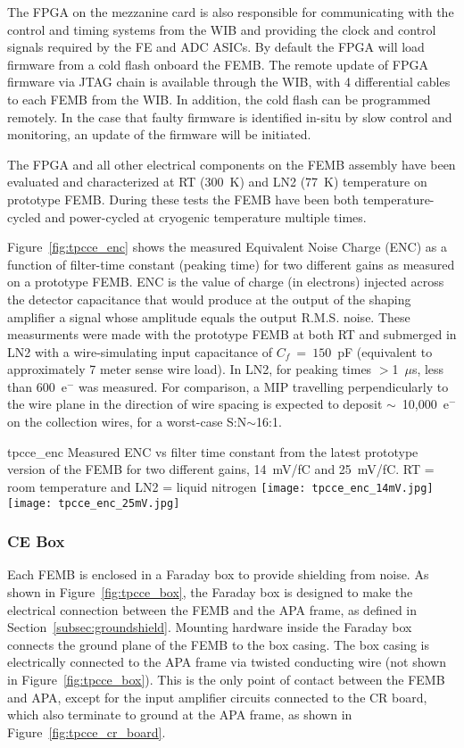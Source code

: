 The FPGA on the mezzanine card is also responsible for communicating with the
control and timing systems from the WIB and providing the clock and control signals required by the FE and ADC ASICs. 
By default the FPGA will load firmware from a cold flash onboard the FEMB. The remote update of 
FPGA firmware via JTAG chain is available through the WIB, with 4 differential cables to each FEMB 
from the WIB. In addition, the cold flash can be programmed remotely. In the case that faulty firmware 
is identified in-situ by slow control and monitoring, an update of the firmware will be initiated.

The FPGA and all other electrical components on the FEMB
assembly have been evaluated and characterized at RT (300~K) and LN2 (77~K) temperature on 
prototype FEMB. During these tests the FEMB have been both temperature-cycled and power-cycled at
cryogenic temperature multiple times.

Figure~\ref{fig:tpcce_enc} shows the measured Equivalent Noise Charge (ENC) as a function of 
filter-time constant (peaking time) for two different gains as measured on a prototype FEMB. ENC is the value of charge 
(in electrons) injected across the detector capacitance that would produce at the output of the 
shaping amplifier a signal whose amplitude equals the output R.M.S. noise. These measurments
were made with the prototype FEMB at both RT and submerged in LN2 with a wire-simulating input capacitance of $C_f~=~150$~pF
(equivalent to approximately 7 meter sense wire load).
In LN2, for peaking times $>$1~$\mu$s, less than 600~e$^{-}$ was measured. For comparison,
a MIP travelling perpendicularly to the wire plane in the direction of wire spacing is
expected to deposit $\sim$~10,000~e$^{-}$ on the collection wires, for a worst-case
S:N$\sim$16:1.

\begin{cdrfigure}{tpcce_enc}{
Measured ENC vs filter time constant from the latest prototype version of the FEMB
for two different gains, 14~mV/fC and 25~mV/fC. RT = room temperature and 
LN2 = liquid nitrogen}
\texttt{[image: tpcce\_enc\_14mV.jpg]}
\texttt{[image: tpcce\_enc\_25mV.jpg]}
\end{cdrfigure}

\subsubsection{CE Box}

Each FEMB is enclosed in a Faraday box to provide shielding from noise. 
As shown in Figure~\ref{fig:tpcce_box}, the Faraday box is designed to make the electrical connection 
between the FEMB and the APA frame, as defined in Section~\ref{subsec:groundshield}. Mounting 
hardware inside the Faraday box connects the ground plane of the FEMB to the box casing. The
box casing is electrically connected to the APA frame via twisted conducting wire (not 
shown in Figure~\ref{fig:tpcce_box}). This is the only point of contact between the FEMB and
APA, except for the input amplifier circuits connected to the CR board, which also terminate to
ground at the APA frame, as shown in Figure~\ref{fig:tpcce_cr_board}.

